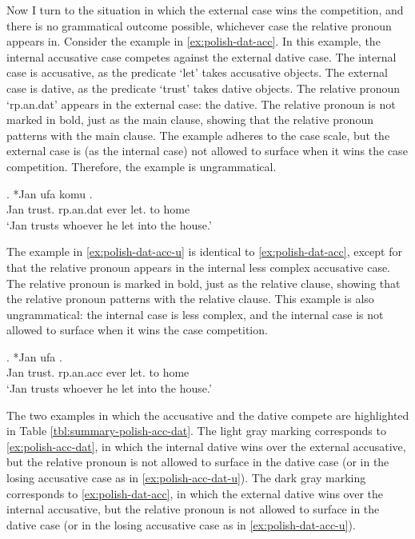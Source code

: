 Now I turn to the situation in which the external case wins the competition, and there is no grammatical outcome possible, whichever case the relative pronoun appears in.
Consider the example in \ref{ex:polish-dat-acc}. In this example, the internal accusative case competes against the external dative case.
The internal case is accusative, as the predicate  `let' takes accusative objects.
The external case is dative, as the predicate  `trust' takes dative objects.
The relative pronoun  `\ac{rp}.\ac{an}.\ac{dat}' appears in the external case: the dative. The relative pronoun is not marked in bold, just as the main clause, showing that the relative pronoun patterns with the main clause.
The example adheres to the case scale, but the external case is (as the internal case) not allowed to surface when it wins the case competition. Therefore, the example is ungrammatical.

\exg. *Jan ufa komu    .\\
Jan trust.\scsub{[dat]} \ac{rp}.\ac{an}.\ac{dat} ever let.\scsub{[acc]} to home\\
`Jan trusts whoever he let into the house.' \label{ex:polish-dat-acc}

The example in \ref{ex:polish-dat-acc-u} is identical to \ref{ex:polish-dat-acc}, except for that the relative pronoun appears in the internal less complex accusative case.
The relative pronoun is marked in bold, just as the relative clause, showing that the relative pronoun patterns with the relative clause.
This example is also ungrammatical: the internal case is less complex, and the internal case is not allowed to surface when it wins the case competition.

\exg. *Jan ufa     .\\
Jan trust.\scsub{[dat]} \ac{rp}.\ac{an}.\ac{acc} ever let.\scsub{[acc]} to home\\
`Jan trusts whoever he let into the house.' \label{ex:polish-dat-acc-u}

The two examples in which the accusative and the dative compete are highlighted in Table \ref{tbl:summary-polish-acc-dat}.
The light gray marking corresponds to \ref{ex:polish-acc-dat}, in which the internal dative wins over the external accusative, but the relative pronoun is not allowed to surface in the dative case (or in the losing accusative case as in \ref{ex:polish-acc-dat-u}).
The dark gray marking corresponds to \ref{ex:polish-dat-acc}, in which the external dative wins over the internal accusative, but the relative pronoun is not allowed to surface in the dative case (or in the losing accusative case as in \ref{ex:polish-dat-acc-u}).

